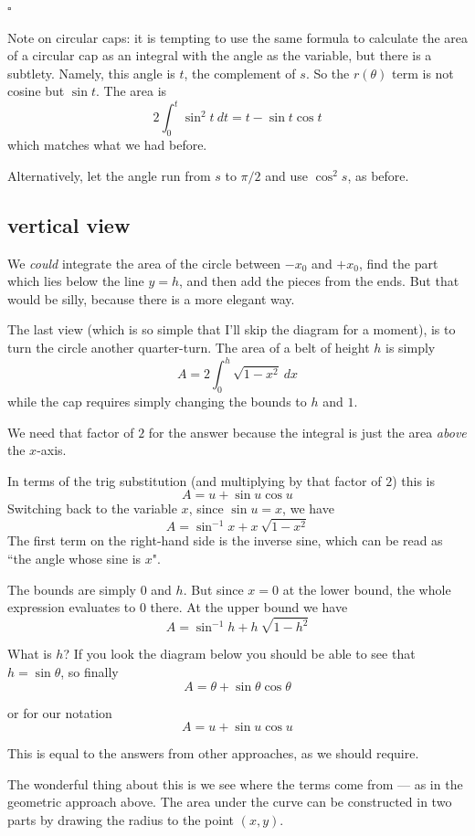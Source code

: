 \documentclass[11pt, oneside]{article}
\begin{document}
$\square$

Note on circular caps:  it is tempting to use the same formula to calculate the area of a circular cap as an integral with the angle as the variable, but there is a subtlety.  Namely, this angle is $t$, the complement of $s$.  So the $r(\theta)$ term is not cosine but $\sin t$.  The area is
\[ 2 \int_0^{t} \sin^2 t \ dt = t - \sin t \cos t \]
which matches what we had before.

Alternatively, let the angle run from $s$ to $\pi/2$ and use $\cos^2 s$, as before.

\subsection*{vertical view}
We \emph{could} integrate the area of the circle between $-x_0$ and $+x_0$, find the part which lies below the line $y = h$, and then add the pieces from the ends.  But that would be silly, because there is a more elegant way.

The last view (which is so simple that I'll skip the diagram for a moment), is to turn the circle another quarter-turn.  The area of a belt of height $h$ is simply
\[ A = 2 \int_0^h  \sqrt{1 - x^2} \ dx \]
while the cap requires simply changing the bounds to $h$ and $1$.

We need that factor of $2$ for the answer because the integral is just the area \emph{above} the $x$-axis.

In terms of the trig substitution (and multiplying by that factor of $2$)  this is
\[ A= u + \sin u \cos u \]
Switching back to the variable $x$, since $\sin u = x$, we have
\[ A = \sin^{-1} x + x \ \sqrt{1 - x^2} \]
The first term on the right-hand side is the inverse sine, which can be read as ``the angle whose sine is $x$".

The bounds are simply $0$ and $h$.  But since $x=0$ at the lower bound, the whole expression evaluates to $0$ there.  At the upper bound we have
\[ A =  \sin^{-1} h + h \ \sqrt{1 - h^2} \]

What is $h$?  If you look the diagram below you should be able to see that $h = \sin \theta$, so finally
\[ A =  \theta + \sin \theta \cos \theta \]

or for our notation
\[ A =  u + \sin u \cos u \]

This is equal to the answers from other approaches, as we should require.

The wonderful thing about this is we see where the terms come from --- as in the geometric approach above.  The area under the curve can be constructed in two parts by drawing the radius to the point $(x,y)$.
\end{document}
